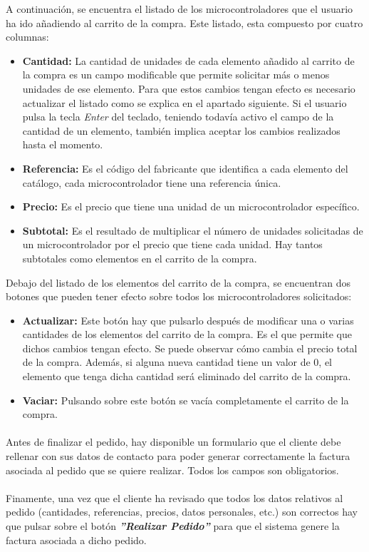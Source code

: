 A continuación, se encuentra el listado de los microcontroladores que el usuario ha ido añadiendo al carrito de la compra. Este listado, esta compuesto por cuatro columnas: 
\begin{itemize}
	\item \textbf{Cantidad:} La cantidad de unidades de cada elemento añadido al carrito de la compra es un campo modificable que permite	solicitar más o menos unidades de ese elemento. Para que estos cambios tengan efecto es necesario actualizar el listado como se explica en el apartado siguiente. Si el usuario pulsa la tecla \textit{Enter} del teclado, teniendo todavía activo el campo de la cantidad de un elemento, también implica aceptar los cambios realizados hasta el momento.
	
	\item \textbf{Referencia:} Es el código del fabricante que identifica a cada elemento del catálogo, cada microcontrolador
	tiene una referencia única.
	
	\item \textbf{Precio:} Es el precio que tiene una unidad de un microcontrolador específico.

	\item \textbf{Subtotal:} Es el resultado de multiplicar el número de unidades solicitadas de un microcontrolador por el precio que tiene cada unidad. Hay tantos subtotales como elementos en el carrito de la compra.
\end{itemize}

Debajo del listado de los elementos del carrito de la compra, se encuentran dos botones que pueden tener efecto sobre todos los microcontroladores solicitados:
\begin{itemize}
	\item \textbf{Actualizar:}  Este botón hay que pulsarlo después de modificar una o varias cantidades de los elementos del 
	carrito de la compra. Es el que permite que dichos cambios tengan efecto. Se puede observar cómo cambia el precio total de la compra.
	Además, si alguna nueva cantidad tiene un valor de 0, el elemento que tenga dicha cantidad será eliminado del carrito de la compra.
	
	\item \textbf{Vaciar:}  Pulsando sobre este botón se vacía completamente el carrito de la compra.
\end{itemize}

\paragraph{}Antes de finalizar el pedido, hay disponible un formulario que el cliente debe rellenar con sus datos de contacto para poder generar correctamente la factura asociada al pedido que se quiere realizar. Todos los campos son obligatorios.

\paragraph{}Finamente, una vez que el cliente ha revisado que todos los datos relativos al pedido (cantidades, referencias, precios, datos personales, etc.) son correctos hay que pulsar sobre el botón \textbf{\textit{''Realizar Pedido''}} para que el sistema genere la factura asociada a dicho pedido.